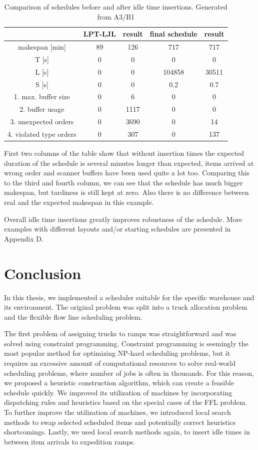 \documentclass{ctuthesis}
\begin{document}
\begin{table}[H]
\begin{tabular}{ |c|| c | c | c | c |} 
\hline
 & LPT-LJL & result & final schedule & result \\ 
\hline
makespan [min] & 89 & 126 & 717 & 717 \\
\hline
T [s]& 0 & 0 & 0 & 0 \\
\hline
L [s]& 0 & 0 & 104858 & 30511 \\
\hline
S [s]& 0 & 0 & 0.2 & 0.7 \\
\hline
1. max. buffer size & 0 & 6 & 0 & 0\\ 
\hline
2. buffer usage  & 0 & 1117 & 0 & 0\\ 
\hline
3. unexpected orders & 0 & 3690 & 0 & 14\\ 
\hline
4. violated type orders & 0 & 307 & 0 & 137\\ 
\hline
\end{tabular}
\caption{Comparison of schedules before and after idle time insertions. Generated from A3/B1} \label{tab:idle1}
\end{table}

First two columns of the table show that without insertion times the expected duration of the schedule is several minutes longer than expected, items arrived at wrong order and scanner buffers have been used quite a lot too. Comparing this to the third and fourth column, we can see that the schedule has much bigger makespan, but tardiness is still kept at zero. Also there is no difference between real and the expected makespan in this example.

Overall idle time insertions greatly improves robustness of the schedule. More examples with different layouts and/or starting schedules are presented in Appendix D.

\chapter{Conclusion}

In this thesis, we implemented a scheduler suitable for the specific warehouse and its environment. The original problem was split into a truck allocation problem and the flexible flow line scheduling problem.

The first problem of assigning trucks to ramps was straightforward and was solved using constraint programming. Constraint programming is seemingly the most popular method for optimizing NP-hard scheduling problems, but it requires an excessive amount of computational resources to solve real-world scheduling problems, where number of jobs is often in thousands. For this reason, we proposed a heuristic construction algorithm, which can create a feasible schedule quickly. We improved its utilization of machines by incorporating dispatching rules and heuristics based on the special cases of the FFL problem.  To further improve the utilization of machines, we introduced local search methods to swap selected scheduled items and potentially correct heuristics shortcomings. Lastly, we used local search methods again, to insert idle times in between item arrivals to expedition ramps.
\end{document}

